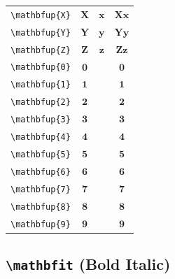 \documentclass[12pt,a4paper]{article}
\begin{document}
\begin{longtable}{|c|c|c|c|}
\verb|\mathbfup{X}| & $\mathbfup{X}$ & $\mathbfup{x}$ & $ 𝐗 𝐱 $ \\
\verb|\mathbfup{Y}| & $\mathbfup{Y}$ & $\mathbfup{y}$ & $ 𝐘 𝐲 $ \\
\verb|\mathbfup{Z}| & $\mathbfup{Z}$ & $\mathbfup{z}$ & $ 𝐙 𝐳 $ \\
\verb|\mathbfup{0}| & $\mathbfup{0}$ & & $ 𝟎 $ \\
\verb|\mathbfup{1}| & $\mathbfup{1}$ & & $ 𝟏 $ \\
\verb|\mathbfup{2}| & $\mathbfup{2}$ & & $ 𝟐 $ \\
\verb|\mathbfup{3}| & $\mathbfup{3}$ & & $ 𝟑 $ \\
\verb|\mathbfup{4}| & $\mathbfup{4}$ & & $ 𝟒 $ \\
\verb|\mathbfup{5}| & $\mathbfup{5}$ & & $ 𝟓 $ \\
\verb|\mathbfup{6}| & $\mathbfup{6}$ & & $ 𝟔 $ \\
\verb|\mathbfup{7}| & $\mathbfup{7}$ & & $ 𝟕 $ \\
\verb|\mathbfup{8}| & $\mathbfup{8}$ & & $ 𝟖 $ \\
\verb|\mathbfup{9}| & $\mathbfup{9}$ & & $ 𝟗 $ \\
\hline
\end{longtable}

\newpage

\subsection*{\texttt{\textbackslash{}mathbfit} (Bold Italic)}
\end{document}
